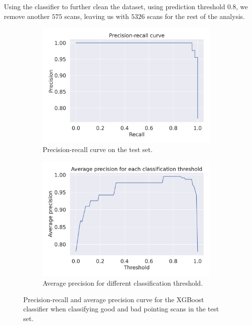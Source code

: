 Using the classifier to further clean the dataset, using prediction threshold $0.8$, we remove another $575$ scans, leaving us with
$5326$ scans for the rest of the analysis.


\begin{figure}[H]
    \centering
    \begin{subfigure}[t]{0.49\textwidth}
        \centering
        \includegraphics[width=1\textwidth]{Clf/precision_recall_curve_both.pdf}
        \caption{Precision-recall curve on the test set.}
        \label{subfig:pr_curve}
    \end{subfigure}
    \begin{subfigure}[t]{0.49\textwidth}
       \centering
       \includegraphics[width=1\textwidth]{Clf/mAP_curve_both.pdf}
       \caption{Average precision for different classification threshold.}
       \label{subfig:map_curve}
    \end{subfigure}
     \caption[Performance plots of XGBoost pointing scan classifier]{Precision-recall and average precision curve for the XGBoost classifier when classifying good and bad pointing scans in the test set.}
     \label{fig:pointing_scan_clf}
\end{figure}



